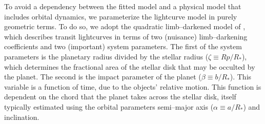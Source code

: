 To avoid a dependency between the fitted model and a physical model
that includes orbital dynamics, we parameterize the lightcurve model
in purely geometric terms.  To do so, we adopt the quadratic
limb--darkened model of \cite{2002ApJ...580L.171M}, which describes
transit lightcurves in terms of two (nuisance) limb--darkening
coefficients and two (important) system parameters.  The first of the
system parameters is the planetary radius divided by the stellar
radius ($\zeta \equiv Rp/R_*$), which determines the fractional area
of the stellar disk that may be occulted by the planet.  The second is
the impact parameter of the planet ($\beta \equiv b/R_*$).  This
variable is a function of time, due to the objects' relative motion.
This function is dependent on the chord that the planet takes across
the stellar disk, itself typically estimated using the orbital
parameters semi--major axis ($\alpha \equiv a/R_*$) and inclination.

